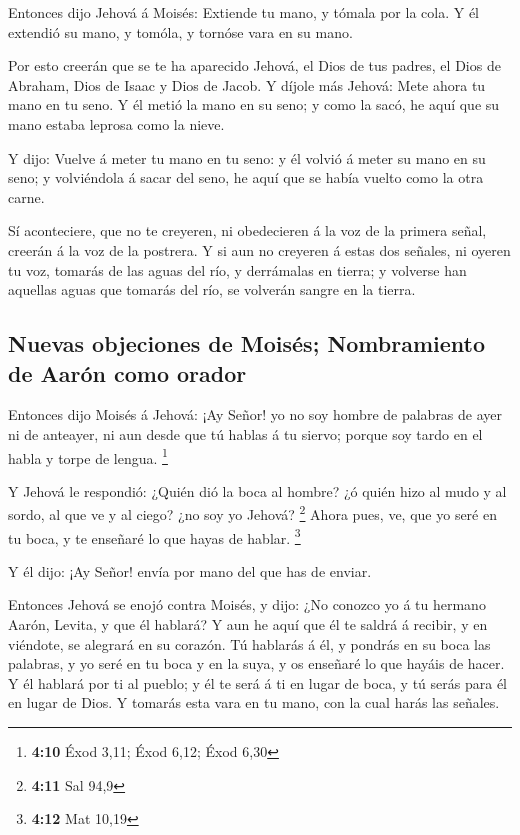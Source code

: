  Entonces dijo Jehová á Moisés: Extiende tu mano, y tómala
por la cola. Y él extendió su mano, y tomóla, y tornóse vara en su mano.

 Por esto creerán que se te ha aparecido Jehová, el Dios de
tus padres, el Dios de Abraham, Dios de Isaac y Dios de Jacob.
 Y díjole más Jehová: Mete ahora tu mano en tu seno. Y él
metió la mano en su seno; y como la sacó, he aquí que su mano estaba
leprosa como la nieve.

 Y dijo: Vuelve á meter tu mano en tu seno: y él volvió á
meter su mano en su seno; y volviéndola á sacar del seno, he aquí que se
había vuelto como la otra carne.

 Sí aconteciere, que no te creyeren, ni obedecieren á la voz
de la primera señal, creerán á la voz de la postrera.  Y si
aun no creyeren á estas dos señales, ni oyeren tu voz, tomarás de las
aguas del río, y derrámalas en tierra; y volverse han aquellas aguas que
tomarás del río, se volverán sangre en la tierra.

\hypertarget{nuevas-objeciones-de-moisuxe9s-nombramiento-de-aaruxf3n-como-orador}{%
\subsection{Nuevas objeciones de Moisés; Nombramiento de Aarón como
orador}\label{nuevas-objeciones-de-moisuxe9s-nombramiento-de-aaruxf3n-como-orador}}

 Entonces dijo Moisés á Jehová: ¡Ay Señor! yo no soy hombre
de palabras de ayer ni de anteayer, ni aun desde que tú hablas á tu
siervo; porque soy tardo en el habla y torpe de lengua. \footnote{\textbf{4:10}
  Éxod 3,11; Éxod 6,12; Éxod 6,30}

 Y Jehová le respondió: ¿Quién dió la boca al hombre? ¿ó
quién hizo al mudo y al sordo, al que ve y al ciego? ¿no soy yo Jehová?
\footnote{\textbf{4:11} Sal 94,9}  Ahora pues, ve, que yo
seré en tu boca, y te enseñaré lo que hayas de hablar. \footnote{\textbf{4:12}
  Mat 10,19}

 Y él dijo: ¡Ay Señor! envía por mano del que has de
enviar.

 Entonces Jehová se enojó contra Moisés, y dijo: ¿No
conozco yo á tu hermano Aarón, Levita, y que él hablará? Y aun he aquí
que él te saldrá á recibir, y en viéndote, se alegrará en su corazón.
 Tú hablarás á él, y pondrás en su boca las palabras, y yo
seré en tu boca y en la suya, y os enseñaré lo que hayáis de hacer.
 Y él hablará por ti al pueblo; y él te será á ti en lugar
de boca, y tú serás para él en lugar de Dios.  Y tomarás
esta vara en tu mano, con la cual harás las señales.

